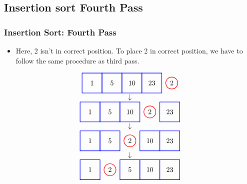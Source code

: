 \documentclass{beamer}
\begin{document}
\subsection{Insertion sort Fourth Pass}
\begin{frame}[c, fragile]
\frametitle{Insertion Sort: Fourth Pass}

\begin{itemize}
    \item Here, 2 isn't in correct position. To place 2 in correct position, we have to follow the same procedure as third pass.
\end{itemize}

\[
\begin{array}{c}
\begin{tikzpicture}[baseline=(current bounding box.center)]
    \node at (0,0) {1};
    \node at (1,0) {5};
    \node at (2,0) {10};
    \node at (3,0) {23};
    \node at (4,0) {2};
    \draw[red, thick] (4,0) circle (0.3);
    \draw[blue, thick] (-0.5,-0.5) rectangle (0.5,0.5);
    \draw[blue, thick] (0.5,-0.5) rectangle (1.5,0.5);
    \draw[blue, thick] (1.5,-0.5) rectangle (2.5,0.5);
    \draw[blue, thick] (2.5,-0.5) rectangle (3.5,0.5);
\end{tikzpicture} \\
\downarrow \\
\begin{tikzpicture}[baseline=(current bounding box.center)]
    \node at (0,0) {1};
    \node at (1,0) {5};
    \node at (2,0) {10};
    \node at (3,0) {2};
    \node at (4,0) {23};
    \draw[red, thick] (3,0) circle (0.3);
    \draw[blue, thick] (-0.5,-0.5) rectangle (0.5,0.5);
    \draw[blue, thick] (0.5,-0.5) rectangle (1.5,0.5);
    \draw[blue, thick] (1.5,-0.5) rectangle (2.5,0.5);
    \draw[blue, thick] (3.5,-0.5) rectangle (4.5,0.5);
\end{tikzpicture} \\
\downarrow \\
\begin{tikzpicture}[baseline=(current bounding box.center)]
    \node at (0,0) {1};
    \node at (1,0) {5};
    \node at (2,0) {2};
    \node at (3,0) {10};
    \node at (4,0) {23};
    \draw[red, thick] (2,0) circle (0.3);
    \draw[blue, thick] (-0.5,-0.5) rectangle (0.5,0.5);
    \draw[blue, thick] (0.5,-0.5) rectangle (1.5,0.5);
    \draw[blue, thick] (2.5,-0.5) rectangle (3.5,0.5);
    \draw[blue, thick] (3.5,-0.5) rectangle (4.5,0.5);
\end{tikzpicture} \\
\downarrow \\
\begin{tikzpicture}[baseline=(current bounding box.center)]
    \node at (0,0) {1};
    \node at (1,0) {2};
    \node at (2,0) {5};
    \node at (3,0) {10};
    \node at (4,0) {23};
    \draw[red, thick] (1,0) circle (0.3);
    \draw[blue, thick] (-0.5,-0.5) rectangle (0.5,0.5);
    \draw[blue, thick] (1.5,-0.5) rectangle (2.5,0.5);
    \draw[blue, thick] (2.5,-0.5) rectangle (3.5,0.5);
    \draw[blue, thick] (3.5,-0.5) rectangle (4.5,0.5);
\end{tikzpicture}
\end{array}
\]
\end{frame}
\end{document}

